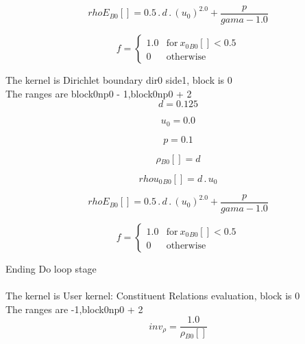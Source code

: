 \documentclass{article}
\begin{document}
\begin{dmath}{rhoE{_{B0}}}[{}] = 0.5 \,.\, d \,.\, \left(u_{0} \right)^{2.0} + \frac{p}{gama - 1.0}\end{dmath}

\begin{dmath}f = \begin{cases} 1.0 & \text{for}\: {x_{0}{_{B0}}}[{}] < 0.5 \\0 & \text{otherwise} \end{cases}\end{dmath}

\noindent The kernel is Dirichlet boundary dir0 side1, block is 0\\\noindent The ranges are block0np0 - 1,block0np0 + 2\\\begin{dmath}d = 0.125\end{dmath}

\begin{dmath}u_{0} = 0.0\end{dmath}

\begin{dmath}p = 0.1\end{dmath}

\begin{dmath}{\rho{_{B0}}}[{}] = d\end{dmath}

\begin{dmath}{rhou_{0}{_{B0}}}[{}] = d \,.\, u_{0}\end{dmath}

\begin{dmath}{rhoE{_{B0}}}[{}] = 0.5 \,.\, d \,.\, \left(u_{0} \right)^{2.0} + \frac{p}{gama - 1.0}\end{dmath}

\begin{dmath}f = \begin{cases} 1.0 & \text{for}\: {x_{0}{_{B0}}}[{}] < 0.5 \\0 & \text{otherwise} \end{cases}\end{dmath}

\noindent Ending Do loop stage\\
\\\noindent The kernel is User kernel: Constituent Relations evaluation, block is 0\\\noindent The ranges are -1,block0np0 + 2\\\begin{dmath}inv_{\rho} = \frac{1.0}{{\rho{_{B0}}}[{}]}\end{dmath}
\end{document}
